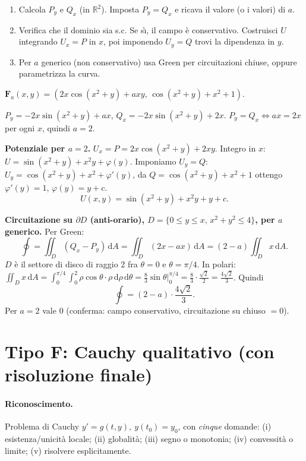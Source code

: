 \documentclass[11pt,a4paper,openany]{book}
\theoremstyle{plain}
\theoremstyle{definition}
\theoremstyle{remark}
\newcommand{\R}{\mathbb{R}}
\newcommand{\dd}{\,\mathrm{d}}
\newcommand{\F}{\mathbf{F}}
\begin{document}
\begin{ricetta}[title={Conservativit\`a parametrica}]
\begin{enumerate}
\item Calcola $P_y$ e $Q_x$ (in $\R^2$). Imposta $P_y=Q_x$ e ricava
   il valore (o i valori) di $a$.
\item Verifica che il dominio sia s.c. Se s\`\i, il campo \`e
   conservativo. Costruisci $U$ integrando $U_x=P$ in $x$, poi
   imponendo $U_y=Q$ trovi la dipendenza in $y$.
\item Per $a$ generico (non conservativo) usa Green per circuitazioni
   chiuse, oppure parametrizza la curva.
\end{enumerate}
\end{ricetta}

\begin{esempio}[title={22/1/2024 --- Esercizio 3}]
$\F_a(x,y)=(2x\cos(x^2+y)+axy,\,\cos(x^2+y)+x^2+1)$.

$P_y=-2x\sin(x^2+y)+ax$,
$Q_x=-2x\sin(x^2+y)+2x$.
$P_y=Q_x\Leftrightarrow ax=2x$ per ogni $x$, quindi $a=2$.

\textbf{Potenziale per $a=2$.}
$U_x=P=2x\cos(x^2+y)+2xy$. Integro in $x$:
$U=\sin(x^2+y)+x^2y+\varphi(y)$. Imponiamo $U_y=Q$:
$U_y=\cos(x^2+y)+x^2+\varphi'(y)$, da $Q=\cos(x^2+y)+x^2+1$ ottengo
$\varphi'(y)=1$, $\varphi(y)=y+c$.
\[
U(x,y)=\sin(x^2+y)+x^2y+y+c.
\]

\textbf{Circuitazione su $\partial D$ (anti-orario), $D=\{0\le y\le x,\,x^2+y^2\le 4\}$, per $a$ generico.}
Per Green:
\[
\oint=\iint_D(Q_x-P_y)\dd A=\iint_D(2x-ax)\dd A=(2-a)\iint_D x\dd A.
\]
$D$ \`e il settore di disco di raggio 2 fra $\theta=0$ e $\theta=\pi/4$.
In polari: $\iint_D x\dd A=\int_0^{\pi/4}\int_0^2\rho\cos\theta\cdot\rho\dd\rho\dd\theta
=\frac{8}{3}\sin\theta\Big|_0^{\pi/4}=\frac{8}{3}\cdot\frac{\sqrt2}{2}=\frac{4\sqrt2}{3}$.
Quindi
\[
\oint=(2-a)\cdot\frac{4\sqrt2}{3}.
\]
Per $a=2$ vale $0$ (conferma: campo conservativo, circuitazione su
chiuso $=0$).
\end{esempio}

\section{Tipo F: Cauchy qualitativo (con risoluzione finale)}

\paragraph{Riconoscimento.} Problema di Cauchy
$y'=g(t,y),\ y(t_0)=y_0$, con \emph{cinque} domande:
(i) esistenza/unicit\`a locale; (ii) globalit\`a; (iii) segno o
monotonia; (iv) convessit\`a o limite; (v) risolvere esplicitamente.
\end{document}
